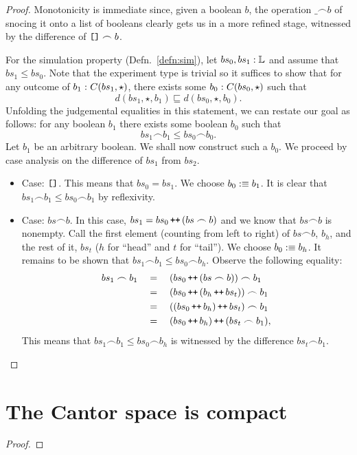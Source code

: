 \begin{proof}
  Monotonicity is immediate since, given a boolean $b$, the operation $\_ \frown b$ of snocing
  it onto a list of booleans clearly gets us in a more refined stage, witnessed by the
  difference of $\text{\texttt{[]}}{} \frown b$.

  For the simulation property (Defn.~\ref{defn:sim}), let $bs_0, bs_1:\mathbb{L}{}$
  and assume that $bs_1 \le bs_0$. Note that the experiment type is trivial so it suffices
  to show that for any outcome of $b_1\hspace{0.1mm}:\hspace{0.1mm}C(bs_1, \star)$, there exists some
  $b_0\hspace{0.1mm}:\hspace{0.1mm}C(bs_0, \star)$ such that
  \begin{equation*}
    d(bs_1, \star, b_1) \sqsubseteq d(bs_0, \star, b_0).
  \end{equation*}
  Unfolding the judgemental equalities in this statement, we can restate our goal as
  follows: for any boolean $b_1$ there exists some boolean $b_0$ such that
  \begin{equation*}
    bs_1 \frown b_1 \le bs_0 \frown b_0.
  \end{equation*}
  Let $b_1$ be an arbitrary boolean. We shall now construct such a $b_0$. We proceed by
  case analysis on the difference of $bs_1$ from $bs_2$.
  \begin{itemize}
    \item Case: $\text{\texttt{[]}}{}$. This means that $bs_0 = bs_1$. We choose
      $b_0 :\equiv b_1$. It is clear that $bs_1 \frown b_1 \le bs_0 \frown b_1$ by reflexivity.
    \item Case: $bs \frown b$. In this case, $bs_1 = bs_0 \operatorname{\text{\texttt{++}}}{} (bs \frown b)$ and we know that
      $bs \frown b$ is nonempty. Call the first element (counting from left to right) of $bs \frown
      b$, $b_h$, and the rest of it, $bs_t$ ($h$ for ``head'' and $t$ for ``tail''). We
      choose $b_0 :\equiv b_h$. It remains to be shown that $bs_1 \frown b_1 \le bs_0 \frown b_h$. Observe
      the following equality:
      \begin{align*}
        bs_1 \frown b_1 \quad&=\quad (bs_0 \operatorname{\text{\texttt{++}}}{} (bs \frown b)) \frown b_1             \\
                   \quad&=\quad (bs_0 \operatorname{\text{\texttt{++}}}{} (b_h \operatorname{\text{\texttt{++}}}{} bs_t)) \frown b_1 \\
                   \quad&=\quad ((bs_0 \operatorname{\text{\texttt{++}}}{} b_h) \operatorname{\text{\texttt{++}}}{} bs_t) \frown b_1 \\
                   \quad&=\quad (bs_0 \operatorname{\text{\texttt{++}}}{} b_h) \operatorname{\text{\texttt{++}}}{} (bs_t \frown b_1) ,
      \end{align*}
      This means that $bs_1 \frown b_1 \le bs_0 \frown b_h$ is witnessed by the difference
      $bs_t \frown b_1$.
  \end{itemize}
\end{proof}

\section{The Cantor space is compact}

\begin{defn}[Compactness]
\end{defn}

\begin{thm}
\end{thm}
\begin{proof}
\end{proof}
